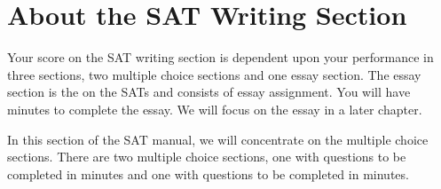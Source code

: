\section{About the SAT Writing Section}

Your score on the SAT writing section is dependent upon your performance in three sections, two multiple choice sections and one essay section. The essay section is the \hrulefill on the SATs and consists of \hrulefill essay assignment. You will have \hrulefill minutes to complete the essay. We will focus on the essay in a later chapter. 

In this section of the SAT manual, we will concentrate on the multiple choice sections. There are two multiple choice sections, one with \hrulefill questions to be completed in \hrulefill minutes and one with \hrulefill questions to be completed in \hrulefill minutes.
